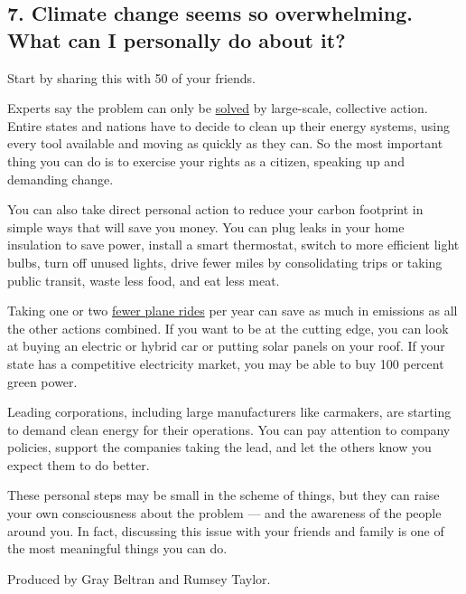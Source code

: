 \hypertarget{7-climate-change-seems-so-overwhelming-what-can-i-personally-do-about-it}{%
\subsection{7. Climate change seems so overwhelming. What can I
personally do about
it?}\label{7-climate-change-seems-so-overwhelming-what-can-i-personally-do-about-it}}

Start by sharing this with 50 of your friends.

Experts say the problem can only be
\href{https://www.nytimes3xbfgragh.onion/interactive/2017/06/09/climate/drawdown-climate-solutions-quiz.html}{solved}
by large-scale, collective action. Entire states and nations have to
decide to clean up their energy systems, using every tool available and
moving as quickly as they can. So the most important thing you can do is
to exercise your rights as a citizen, speaking up and demanding change.

You can also take direct personal action to reduce your carbon footprint
in simple ways that will save you money. You can plug leaks in your home
insulation to save power, install a smart thermostat, switch to more
efficient light bulbs, turn off unused lights, drive fewer miles by
consolidating trips or taking public transit, waste less food, and eat
less meat.

Taking one or two
\href{https://www.nytimes3xbfgragh.onion/2017/07/27/climate/airplane-pollution-global-warming.html}{fewer
plane rides} per year can save as much in emissions as all the other
actions combined. If you want to be at the cutting edge, you can look at
buying an electric or hybrid car or putting solar panels on your roof.
If your state has a competitive electricity market, you may be able to
buy 100 percent green power.

Leading corporations, including large manufacturers like carmakers, are
starting to demand clean energy for their operations. You can pay
attention to company policies, support the companies taking the lead,
and let the others know you expect them to do better.

These personal steps may be small in the scheme of things, but they can
raise your own consciousness about the problem --- and the awareness of
the people around you. In fact, discussing this issue with your friends
and family is one of the most meaningful things you can do.

Produced by Gray Beltran and Rumsey Taylor.

